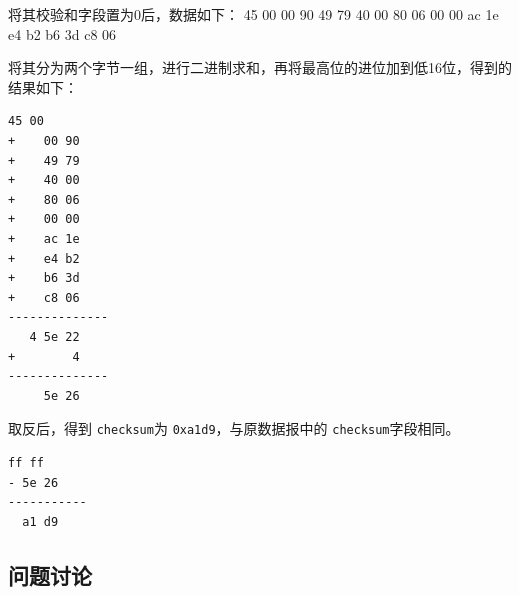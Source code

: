 \documentclass{article}
\begin{document}
将其校验和字段置为0后，数据如下：
45 00 00 90 49 79 40 00 80 06 00 00 ac 1e e4 b2 b6 3d c8 06

将其分为两个字节一组，进行二进制求和，再将最高位的进位加到低16位，得到的结果如下：

\begin{lstlisting}[numbers=none]
     45 00 
+    00 90 
+    49 79 
+    40 00 
+    80 06 
+    00 00 
+    ac 1e 
+    e4 b2 
+    b6 3d 
+    c8 06
--------------
   4 5e 22
+        4
--------------
     5e 26
\end{lstlisting}

取反后，得到 \texttt{checksum}为 \texttt{0xa1d9}，与原数据报中的 \texttt{checksum}字段相同。

\begin{lstlisting}[numbers=none]
  ff ff
- 5e 26
-----------
  a1 d9
\end{lstlisting}

\subsection{问题讨论}
\end{document}
